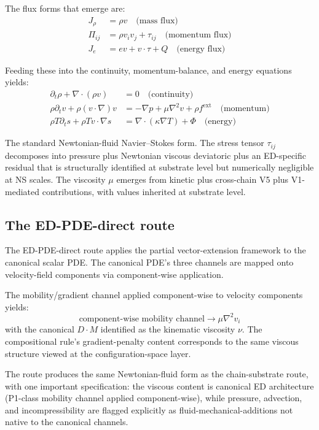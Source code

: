 \documentclass[11pt,a4paper]{article}
\begin{document}
The flux forms that emerge are:
\begin{align*}
J_\rho &= \rho v \quad \text{(mass flux)} \\
\Pi_{ij} &= \rho v_i v_j + \tau_{ij} \quad \text{(momentum flux)} \\
J_e &= e v + v\cdot\tau + Q \quad \text{(energy flux)}
\end{align*}

Feeding these into the continuity, momentum-balance, and energy equations yields:
\begin{align*}
\partial_t\rho + \nabla\cdot(\rho v) &= 0 \quad \text{(continuity)} \\
\rho\partial_t v + \rho(v\cdot\nabla)v &= -\nabla p + \mu\nabla^2 v + \rho f^{\mathrm{ext}} \quad \text{(momentum)} \\
\rho T\partial_t s + \rho T v\cdot\nabla s &= \nabla\cdot(\kappa\nabla T) + \Phi \quad \text{(energy)}
\end{align*}

The standard Newtonian-fluid Navier--Stokes form. The stress tensor $\tau_{ij}$ decomposes into pressure plus Newtonian viscous deviatoric plus an ED-specific residual that is structurally identified at substrate level but numerically negligible at NS scales. The viscosity $\mu$ emerges from kinetic plus cross-chain V5 plus V1-mediated contributions, with values inherited at substrate level.

\subsection{The ED-PDE-direct route}

The ED-PDE-direct route applies the partial vector-extension framework to the canonical scalar PDE. The canonical PDE's three channels are mapped onto velocity-field components via component-wise application.

The mobility/gradient channel applied component-wise to velocity components yields:
\[
\text{component-wise mobility channel} \to \mu\nabla^2 v_i
\]
with the canonical $D \cdot M$ identified as the kinematic viscosity $\nu$. The compositional rule's gradient-penalty content corresponds to the same viscous structure viewed at the configuration-space layer.

The route produces the same Newtonian-fluid form as the chain-substrate route, with one important specification: the viscous content is canonical ED architecture (P1-class mobility channel applied component-wise), while pressure, advection, and incompressibility are flagged explicitly as fluid-mechanical-additions not native to the canonical channels.
\end{document}

